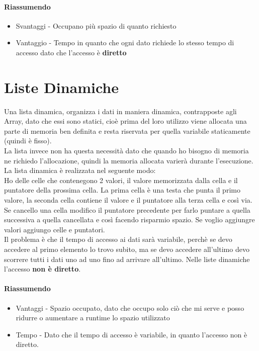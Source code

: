 \paragraph*{Riassumendo}
\begin{itemize}
    \item Svantaggi - Occupano più spazio di quanto richiesto
    \item Vantaggio - Tempo in quanto che ogni dato richiede lo stesso tempo di accesso dato che
    l'accesso è \textbf{diretto}
\end{itemize}
\section{Liste Dinamiche}
Una lista dinamica, organizza i dati in maniera dinamica, contrapposte agli Array, 
dato che essi sono statici, cioè prima del loro utilizzo viene allocata una parte di
memoria ben definita e resta riservata per quella variabile staticamente (quindi è fisso).\\
La lista invece non ha questa necessità dato che quando ho bisogno di memoria ne richiedo
l'allocazione, quindi la memoria allocata varierà durante l'esecuzione.\\
La lista dinamica è realizzata nel seguente modo:\\
Ho delle celle che contenegono 2 valori, il valore memorizzata dalla cella e il puntatore della prossima cella.
La prima cella è una testa che punta il primo valore, la seconda cella contiene il valore 
e il puntatore alla terza cella e così via.\\
Se cancello una cella modifico il puntatore precedente per farlo puntare a quella successiva a quella
cancellata e così facendo risparmio spazio. Se voglio aggiungre valori aggiungo celle e puntatori.\\
Il problema è che il tempo di accesso ai dati sarà variabile, perchè se devo accedere al primo elemento
lo trovo subito, ma se devo accedere all'ultimo devo scorrere tutti i dati uno ad uno fino ad arrivare 
all'ultimo. Nelle liste dinamiche l'accesso \textbf{non è diretto}.
\paragraph*{Riassumendo}
\begin{itemize}
    \item Vantaggi - Spazio occupato, dato che occupo solo ciò che mi serve e posso ridurre o aumentare
    a runtime lo spazio utilizzato
    \item Tempo - Dato che il tempo di accesso è variabile, in quanto l'accesso non è diretto.
\end{itemize}
